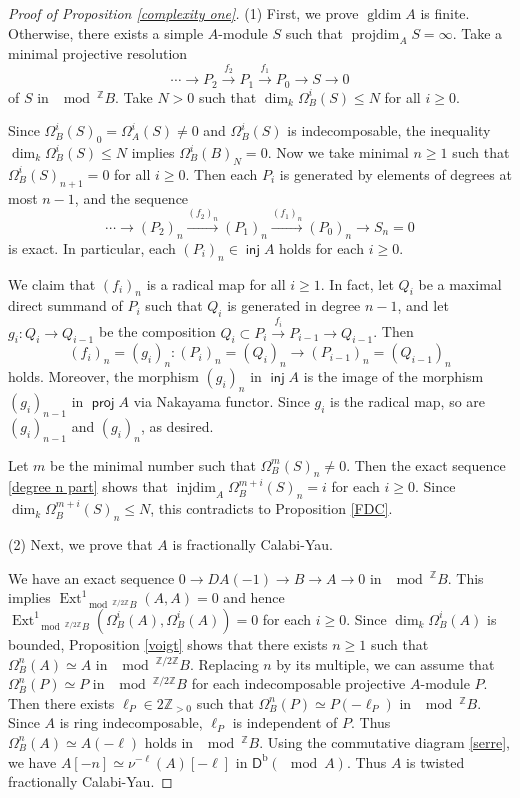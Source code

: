 \documentclass[a4paper,reqno,11pt]{amsart}
\theoremstyle{definition}
\newcommand{\DDD}{\mathsf{D}}
\newcommand{\Z}{\mathbb{Z}}
\newcommand{\bo}{\operatorname{b}\nolimits}
\newcommand{\projdim}{\operatorname{projdim}\nolimits}
\newcommand{\gldim}{\operatorname{gldim}\nolimits}
\newcommand{\Ext}{\operatorname{Ext}\nolimits}
\newcommand{\injdim}{\operatorname{injdim}\nolimits}
\DeclareMathOperator{\proj}{\mathsf{proj}}
\DeclareMathOperator{\inj}{\mathsf{inj}}
\numberwithin{equation}{section}
\begin{document}
{\begin{proof}[Proof of Proposition \ref{complexity one}]
(1) First, we prove $\gldim A$ is finite.
Otherwise, there exists a simple $A$-module $S$ such that $\projdim_AS=\infty$. Take a minimal projective resolution
\[\cdots\to P_2\xrightarrow{f_2} P_1\xrightarrow{f_1} P_0\to S\to0\]
of $S$ in $\mod^{\Z}B$. Take $N>0$ such that $\dim_k\Omega_B^i(S)\le N$ for all $i\ge0$.

Since $\Omega_B^i(S)_0=\Omega_A^i(S)\neq0$ and $\Omega_B^i(S)$ is indecomposable, the inequality $\dim_k\Omega_B^i(S)\le N$ implies $\Omega_B^i(B)_N=0$. Now we take minimal $n\ge1$ such that $\Omega_B^i(S)_{n+1}=0$ for all $i\ge0$. Then each $P_i$ is generated by elements of degrees at most $n-1$, and the sequence
\begin{equation}\label{degree n part}
\cdots\to (P_2)_n\xrightarrow{(f_2)_n} (P_1)_n\xrightarrow{(f_1)_n} (P_0)_n\to S_n=0
\end{equation}
is exact. In particular, each $(P_i)_n\in\inj A$ holds for each $i\ge0$.

We claim that $(f_i)_n$ is a radical map for all $i\ge1$. In fact, let $Q_i$ be a maximal direct summand of $P_i$ such that $Q_i$ is generated in degree $n-1$, and let $g_i:Q_i\to Q_{i-1}$ be the composition $Q_i\subset P_i\xrightarrow{f_i}P_{i-1}\to Q_{i-1}$. Then
\[(f_i)_n=(g_i)_n:(P_i)_n=(Q_i)_n\to (P_{i-1})_n=(Q_{i-1})_n\]
holds. Moreover, the morphism $(g_i)_n$ in $\inj A$ is the image of the morphism $(g_i)_{n-1}$ in $\proj A$ via Nakayama functor. Since $g_i$ is the radical map, so are $(g_i)_{n-1}$ and $(g_i)_n$, as desired.

Let $m$ be the minimal number such that $\Omega_B^m(S)_n\neq0$. Then the exact sequence \eqref{degree n part} shows that $\injdim_A\Omega_B^{m+i}(S)_n=i$ for each $i\ge0$. Since $\dim_k\Omega_B^{m+i}(S)_n\le N$, this contradicts to Proposition \ref{FDC}.

(2) Next, we prove that $A$ is fractionally Calabi-Yau.

We have an exact sequence $0\to DA(-1)\to B\to A\to0$ in $\mod^{\Z}B$. This implies $\Ext^1_{\mod^{\Z/2\Z}B}(A,A)=0$ and hence  $\Ext^1_{\mod^{\Z/2\Z}B}(\Omega_B^i(A),\Omega_B^i(A))=0$ for each $i\ge0$. 
Since $\dim_k\Omega_B^i(A)$ is bounded, Proposition \ref{voigt} shows that there exists $n\ge1$ such that $\Omega_B^n(A)\simeq A$ in $\mod^{\Z/2\Z}B$. Replacing $n$ by its multiple, we can assume that $\Omega_B^n(P)\simeq P$ in $\mod^{\Z/2\Z}B$ for each indecomposable projective $A$-module $P$.
Then there exists $\ell_P\in 2\Z_{>0}$ such that $\Omega_B^n(P)\simeq P(-\ell_P)$ in $\mod^{\Z}B$.
Since $A$ is ring indecomposable, $\ell_P$ is independent of $P$. Thus $\Omega_B^n(A)\simeq A(-\ell)$ holds in $\mod^{\Z}B$. Using the commutative diagram \eqref{serre}, we have $A[-n]\simeq\nu^{-\ell}(A)[-\ell]$ in $\DDD^
{\bo}(\mod A)$. Thus $A$ is twisted fractionally Calabi-Yau.
\end{proof}
}
\end{document}

